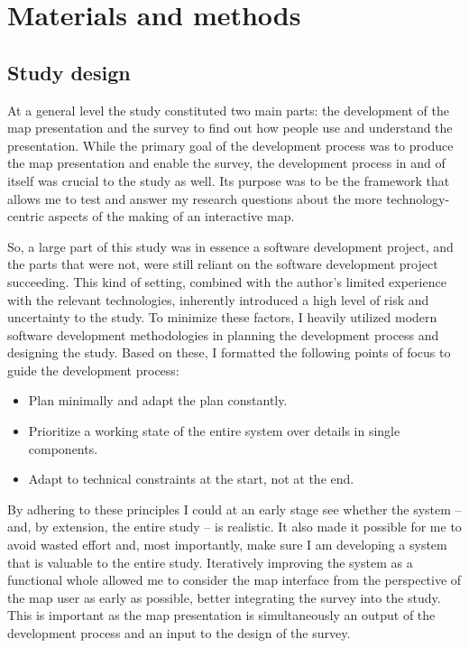 \section{Materials and methods}

\subsection{Study design}

At a general level the study constituted two main parts:
the development of the map presentation and
the survey to find out how
people use and understand the presentation.
While the primary goal of the development process was
to produce the map presentation and enable the survey,
the development process in and of itself was crucial to the study as well.
Its purpose was to be the framework that
allows me to test and answer my research questions
about the more technology-centric aspects of
the making of an interactive map.

So, a large part of this study was
in essence a software development project,
and the parts that were not, were still reliant on
the software development project succeeding.
This kind of setting,
combined with the author's limited experience with the relevant technologies,
inherently introduced a high level of risk and uncertainty to the study.
To minimize these factors,
I heavily utilized modern software development methodologies
\parencite{saq2020, bec2001, sha2017} in planning the development process
and designing the study.
Based on these,
I formatted the following points of focus
to guide the development process:
\begin{itemize}
	\item Plan minimally and adapt the plan constantly.
	\item Prioritize a working state of the entire system over details in single components.
	\item Adapt to technical constraints at the start, not at the end.
\end{itemize}

By adhering to these principles I could at an early stage see whether the system --
and, by extension, the entire study -- is realistic.
It also made it possible for me to avoid wasted effort and, most importantly,
make sure I am developing a system that is valuable to the entire study.
Iteratively improving the system as a functional whole
allowed me to consider the map interface
from the perspective of the map user as early as possible,
better integrating the survey into the study.
This is important as the map presentation is simultaneously an output of the development process
and an input to the design of the survey.

